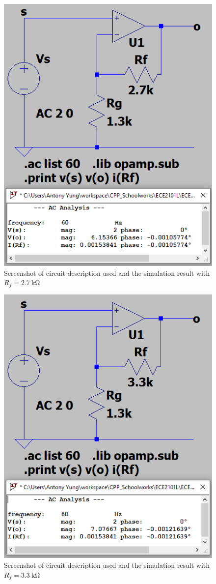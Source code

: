 \documentclass{article}
\begin{document}
\begin{figure}[H]
    \centering
        \includegraphics[scale=1]{ECE2101L_Lab08_B1_2700.png}
        \caption{Screenshot of circuit description used and the simulation result with $R_f=\SI{2.7}{\kilo\ohm}$}
\end{figure}
\begin{figure}[H]
    \centering
        \includegraphics[scale=1]{ECE2101L_Lab08_B1_3300.png}
        \caption{Screenshot of circuit description used and the simulation result with $R_f=\SI{3.3}{\kilo\ohm}$}
\end{figure}
\end{document}
